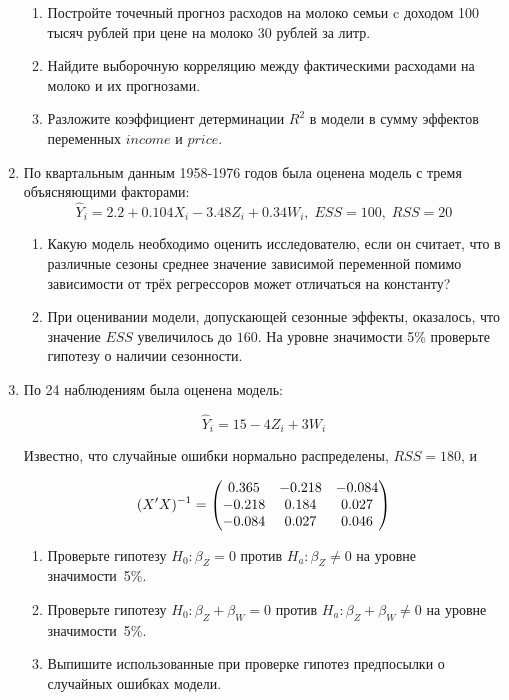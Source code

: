 \documentclass[12pt, a4paper]{article}\usepackage[]{graphicx}\usepackage[]{color}
\begin{document}
\begin{enumerate}
\begin{enumerate}
\item Постройте точечный прогноз расходов на молоко семьи c доходом 100 тысяч рублей при цене на молоко 30 рублей за литр.
\item Найдите выборочную корреляцию между фактическими расходами на молоко и их прогнозами.
\item Разложите коэффициент детерминации $R^2$ в модели в сумму эффектов переменных $income$ и $price$.
\end{enumerate}




\item По квартальным данным 1958-1976 годов была оценена модель с тремя объясняющими факторами:
\[
\hat Y_i = 2.2 + 0.104 X_i - 3.48 Z_i + 0.34 W_i, \; ESS = 100, \; RSS = 20
\]

\begin{enumerate}
\item Какую модель необходимо оценить исследователю, если он считает, что в различные сезоны среднее значение зависимой переменной помимо зависимости от трёх регрессоров может отличаться на константу?
\item При оценивании модели, допускающей сезонные эффекты, оказалось, что значение $ESS$ увеличилось до $160$.
На уровне значимости 5\% проверьте гипотезу о наличии сезонности.
\end{enumerate}



\item По 24 наблюдениям была оценена модель:

\[
\widehat{Y}_i=15-4Z_i+3W_i
\]

Известно, что случайные ошибки нормально распределены, $RSS=180$, и

\[
(X'X)^{-1} =
\ensuremath{%
\begin{pmatrix}{}
  0.365 & -0.218 & -0.084 \\ 
  -0.218 & 0.184 & 0.027 \\ 
  -0.084 & 0.027 & 0.046 \\ 
  \end{pmatrix}
}
\]


\begin{enumerate}
\item Проверьте гипотезу $H_0: \beta_Z = 0$ против $H_a: \beta_Z \neq 0$ на уровне значимости~5\%.
\item Проверьте гипотезу $H_0: \beta_Z + \beta_W = 0$  против $H_a: \beta_Z + \beta_W \neq 0$ на уровне значимости~5\%.
\item Выпишите использованные при проверке гипотез предпосылки о случайных ошибках модели.
\end{enumerate}


\end{enumerate}
\end{document}
